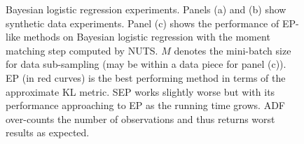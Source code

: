 \begin{figure}
\centering
{}
%
%
\caption{Bayesian logistic regression experiments. Panels (a) and (b) show synthetic data experiments. Panel (c) shows the performance of EP-like methods on Bayesian logistic regression with the moment matching step computed by NUTS. $M$ denotes the mini-batch size for data sub-sampling (may be within a data piece for panel (c)). EP (in red curves) is the best performing method in terms of the approximate KL metric.  SEP works slightly worse but with its performance approaching to EP as the running time grows. ADF over-counts the number of observations and thus returns worst results as expected.}
\end{figure}

